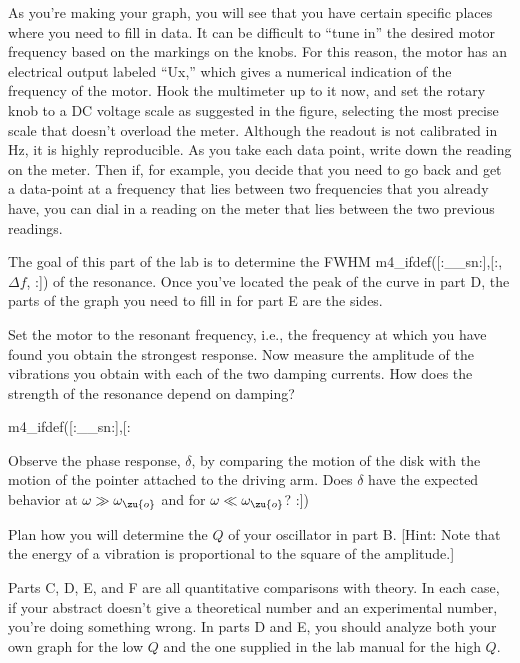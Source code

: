 As you're making your graph, you will see that you have certain specific
places where you need to fill in data. It can be difficult to ``tune in''
the desired motor frequency based on the markings on the knobs.
For this reason, the motor has an electrical output labeled ``Ux,''
which gives a numerical indication of the frequency of the motor. Hook the multimeter up
to it now, and set the rotary knob to a DC voltage scale as suggested in the figure,
selecting the most precise scale that doesn't overload the meter. Although the readout
is not calibrated in Hz, it is highly reproducible. As you take each data point,
write down the reading on the meter. Then if, for example, you decide that you need
to go back and get a data-point at a frequency that lies between two frequencies
that you already have, you can dial in a reading on the meter that lies between the
two previous readings.


The goal of this part of the lab is to determine 
the FWHM m4_ifdef([:__sn:],[:, $\Delta f$, :])  of the resonance.
Once you've located the peak of the curve in part D, the parts of the
graph you need to fill in for part E are the sides.


Set the motor to the resonant frequency, i.e., the frequency
at which you have found you obtain the strongest response.
Now measure the amplitude of the vibrations you obtain with
each of the two damping currents. How does the strength of
the resonance depend on damping?

m4_ifdef([:__sn:],[:%

Observe the phase response, $\delta$, by comparing the
motion of the disk with the motion of the pointer attached to
the driving arm. Does $\delta$ have the expected behavior
at $\omega \gg \omega_\zu{o}$ and for $\omega \ll \omega_\zu{o}$?
:])

\prelab

\prelabquestion  Plan how you will determine the $Q$ of your oscillator
in part B. [Hint: Note that the energy of a vibration is
proportional to the square of the amplitude.]

\analysis

Parts C, D, E, and F are all quantitative comparisons with theory.
In each case, if your abstract doesn't give a theoretical number and
an experimental number, you're doing something wrong.
In parts D and E, you should analyze both your own graph for the low $Q$ and
the one supplied in the lab manual for the high $Q$.
